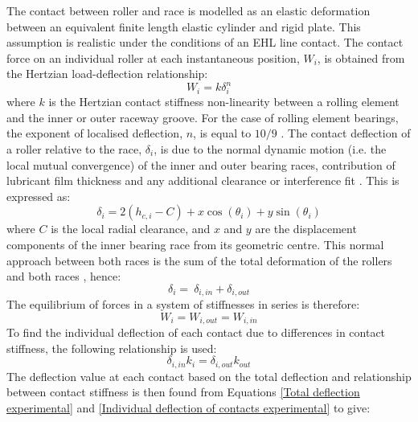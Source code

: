 The contact between roller and race is modelled as an elastic deformation between an equivalent finite length elastic cylinder and rigid plate. This assumption is realistic under the conditions of an EHL line contact. The contact force on an individual roller at each instantaneous position, $W_i$, is obtained from the Hertzian load-deflection relationship:
\begin{equation}\label{Hertz load deflection}
	W_i=k \delta_i^n
\end{equation}
where $k$ is the Hertzian contact stiffness non-linearity between a rolling element and the inner or outer raceway groove. For the case of rolling element bearings, the exponent of localised deflection, $n$, is equal to $10/9$ \cite{Harris1984}. The contact deflection of a roller relative to the race, $\delta_i$, is due to the normal dynamic motion (i.e. the local mutual convergence) of the inner and outer bearing races, contribution of lubricant film thickness and any additional clearance or interference fit \cite{Mohammadpour2015c}. This is expressed as:
\begin{equation}\label{Contact deflection experimental}
	\delta_i=2\left(h_{c,i}-C\right)+x\cos{\left(\theta_i\right)}+y\sin(\theta_i)
\end{equation}
where $C$ is the local radial clearance, and $x$ and $y$ are the displacement components of the inner bearing race from its geometric centre. This normal approach between both races is the sum of the total deformation of the rollers and both races \cite{Hamrock1981}, hence:
\begin{equation}\label{Total deflection experimental}
\delta_i=\ \delta_{i,in}+\delta_{i,out}
\end{equation}
The equilibrium of forces in a system of stiffnesses in series is therefore:
\begin{equation}\label{Equilibrium of force experimental}
W_i=W_{i,out}=W_{i,in}
\end{equation}
To find the individual deflection of each contact due to differences in contact stiffness, the following relationship is used:
\begin{equation}\label{Individual deflection of contacts experimental}
{\delta_{i,in}}k_i={\delta_{i,out}}k_{out}
\end{equation}
The deflection value at each contact based on the total deflection and relationship between contact stiffness is then found from Equations \ref{Total deflection experimental} and \ref{Individual deflection of contacts experimental} to give:
